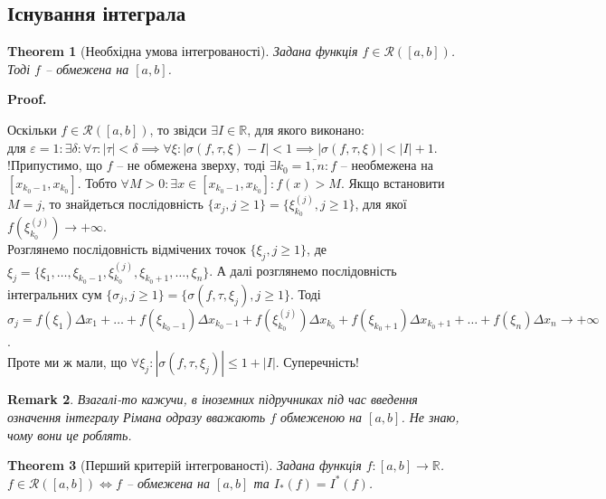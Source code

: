 \documentclass[a4paper, 10pt]{article}
\makeatletter
\theoremstyle{theoremdd}
\newtheorem{theorem}{Theorem}[subsection]
\theoremstyle{theoremdd}
\theoremstyle{theoremdd}
\theoremstyle{theoremdd}
\theoremstyle{theoremdd}
\theoremstyle{theoremdd}
\theoremstyle{theoremdd}
\newtheorem{remark}[theorem]{Remark}
\theoremstyle{theoremdd}
\theoremstyle{theoremdd}
\renewenvironment{proof}[1][Proof.\\]{\par
\pushQED{\hfill \qed}%
\normalfont \topsep6\p@\@plus6\p@\relax
\trivlist
\item\relax
{\bfseries
#1\@addpunct{.}}\hspace\labelsep\ignorespaces
}{%
\popQED\endtrivlist\@endpefalse
}
\makeatother
\begin{document}
\subsection{Існування інтеграла}
\begin{theorem}[Необхідна умова інтегрованості]
Задана функція $f \in \mathcal{R}([a,b])$. Тоді $f$ -- обмежена на $[a,b]$.
\end{theorem}

\begin{proof}
Оскільки $f \in \mathcal{R}([a,b])$, то звідси $\exists I \in \mathbb{R}$, для якого виконано:\\
для $\varepsilon = 1: \exists \delta: \forall \tau: |\tau| < \delta \implies \forall \xi: |\sigma(f, \tau, \xi) - I| < 1 \implies |\sigma(f, \tau, \xi)| < |I|+1$.\\
!Припустимо, що $f$ -- не обмежена зверху, тоді $\exists k_0 = \overline{1,n}: f$ -- необмежена на $[x_{k_0-1},x_{k_0}]$. Тобто $\forall M > 0: \exists x \in [x_{k_0-1},x_{k_0}]: f(x) > M$. Якщо встановити $M = j$, то знайдеться послідовність $\{x_j, j \geq 1\} = \{\xi_{k_0}^{(j)}, j \geq 1 \}$, для якої $f \left(\xi_{k_0}^{(j)} \right) \to +\infty$. \\
Розглянемо послідовність відмічених точок $\{\xi_j, j \geq 1\}$, де $\xi_j = \{\xi_1, \dots, \xi_{k_0-1}, \xi_{k_0}^{(j)}, \xi_{k_0+1}, \dots, \xi_n\}$. А далі розглянемо послідовність інтегральних сум $\{\sigma_j, j \geq 1\} = \{\sigma(f,\tau,\xi_j), j \geq 1 \}$. Тоді\\
$\sigma_j = f(\xi_1)\Delta x_1 + \dots + f(\xi_{k_0-1})\Delta x_{k_0-1} + f(\xi_{k_0}^{(j)}) \Delta x_{k_0} + f(\xi_{k_0+1}) \Delta x_{k_0+1} + \dots + f(\xi_n) \Delta x_n \to +\infty$.\\
Проте ми ж мали, що $\forall \xi_j: |\sigma(f,\tau, \xi_j)| \leq 1 + |I|$. Суперечність!
\end{proof}

\begin{remark}
Взагалі-то кажучи, в іноземних підручниках під час введення означення інтегралу Рімана одразу вважають $f$ обмеженою на $[a,b]$. Не знаю, чому вони це роблять.
\end{remark}

\begin{theorem}[Перший критерій інтегрованості]
Задана функція $f \colon [a,b] \to \mathbb{R}$.\\
$f \in \mathcal{R}([a,b]) \iff f$ -- обмежена на $[a,b]$ та $I_*(f) = I^*(f)$.
\end{theorem}
\end{document}
